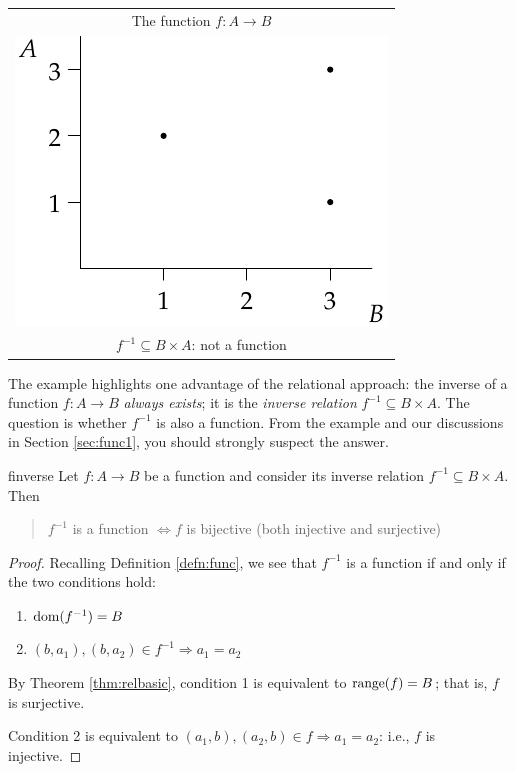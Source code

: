 \begin{example}[lower separated=false, sidebyside, sidebyside align=top seam, sidebyside gap=0pt, righthand width=0.33\linewidth]{}{}
\begin{tabular}{@{}c@{}}
		The function $f:A\to B$\\[6pt]
		\includegraphics{relations-19-reln1}\\
		$f^{-1}\subseteq B\times A$: not a function
	\end{tabular}
\end{example}

The example highlights one advantage of the relational approach: the inverse of a function $f:A\to B$ \emph{always exists}; it is the \emph{inverse relation} $f^{-1}\subseteq B\times A$. The question is whether $f^{-1}$ is also a function. From the example and our discussions in Section \ref{sec:func1}, you should strongly suspect the answer.

\begin{thm}{}{finverse}
	Let $f:A\to B$ be a function and consider its inverse relation $f^{-1}\subseteq B\times A$. Then
	\begin{quote}
		$f^{-1}$ is a function $\iff f$ is bijective (both injective and surjective)
	\end{quote} 
\end{thm}

\begin{proof}
	Recalling Definition \ref{defn:func}, we see that $f^{-1}$ is a function if and only if the two conditions hold:
	\begin{enumerate}
	  \item $\operatorname{dom}(f^{-1})=B$
	  \item $(b,a_1),(b,a_2)\in f^{-1}\Longrightarrow a_1=a_2$
	\end{enumerate}
	By Theorem \ref{thm:relbasic}, condition 1 is equivalent to $\operatorname{range}(f)=B$; that is, $f$ is surjective.\par
	Condition 2 is equivalent to $(a_1,b),(a_2,b)\in f\Longrightarrow a_1=a_2$: i.e., $f$ is injective.
\end{proof}

